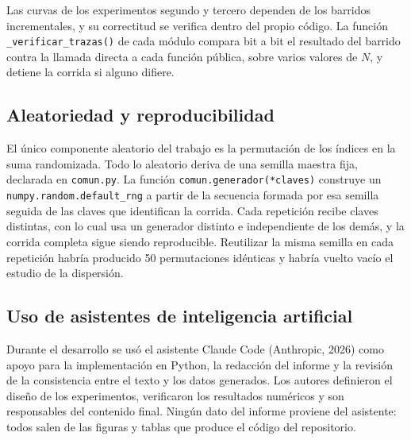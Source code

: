 Las curvas de los experimentos segundo y tercero dependen de los barridos incrementales, y su
correctitud se verifica dentro del propio código. La función \texttt{\_verificar\_trazas()} de cada
módulo compara bit a bit el resultado del barrido contra la llamada directa a cada función pública,
sobre varios valores de $N$, y detiene la corrida si alguno difiere.

\subsection{Aleatoriedad y reproducibilidad}
\label{subsec:semillas}

El único componente aleatorio del trabajo es la permutación de los índices en la suma randomizada.
Todo lo aleatorio deriva de una semilla maestra fija, declarada en \texttt{comun.py}. La función
\texttt{comun.generador(*claves)} construye un \texttt{numpy.random.default\_rng} a partir de la
secuencia formada por esa semilla seguida de las claves que identifican la corrida. Cada repetición
recibe claves distintas, con lo cual usa un generador distinto e independiente de los demás, y la
corrida completa sigue siendo reproducible.
Reutilizar la misma semilla en cada repetición habría producido 50 permutaciones idénticas y habría
vuelto vacío el estudio de la dispersión.

\subsection{Uso de asistentes de inteligencia artificial}
\label{subsec:ia}

Durante el desarrollo se usó el asistente Claude Code (Anthropic, 2026) como apoyo para la
implementación en Python, la redacción del informe y la revisión de la consistencia entre el texto y
los datos generados. Los autores definieron el diseño de los experimentos, verificaron los
resultados numéricos y son responsables del contenido final. Ningún dato del informe proviene del
asistente: todos salen de las figuras y tablas que produce el código del repositorio.

